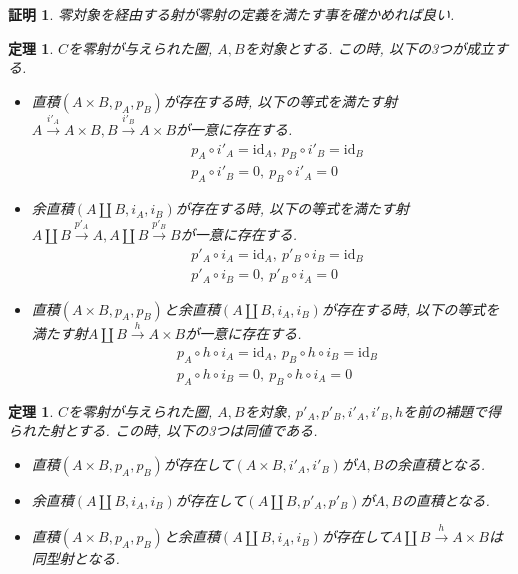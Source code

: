 \documentclass[a4paper,12pt]{ltjsarticle}
\theoremstyle{break}
\newtheorem{thrm}[thm]{定理}
\newtheorem*{prf}{証明}
\newcommand{\xr}[1]{\xrightarrow{#1}}
\newcommand{\id}{\mathrm{id}}
\newcommand{\ci}{\circ}
\newcommand{\ti}{\times}
\newcommand{\am}{\amalg}
\numberwithin{equation}{section}
\begin{document}
\begin{prf}
  零対象を経由する射が零射の定義を満たす事を確かめれば良い. 
\end{prf}


\begin{thrm}
  $C$を零射が与えられた圏, $A,B$を対象とする. 
  この時, 以下の3つが成立する. 
  \begin{itemize}
    \item 直積$(A \ti B,p_A,p_B)$が存在する時, 以下の等式を満たす射$A \xr{i'_A} A \ti B, B \xr{i'_B} A \ti B$が一意に存在する. 
    \begin{align*}
      &p_A \ci i'_A = \id_A, ~ p_B \ci i'_B = \id_B \\
      &p_A \ci i'_B = 0, ~ p_B \ci i'_A = 0
    \end{align*}
    \item 余直積$(A \am B,i_A,i_B)$が存在する時, 以下の等式を満たす射$A \am B \xr{p'_A} A,A \am B \xr{p'_B} B$が一意に存在する. 
    \begin{align*}
      &p'_A \ci i_A = \id_A, ~ p'_B \ci i_B = \id_B \\
      &p'_A \ci i_B = 0, ~ p'_B \ci i_A = 0
    \end{align*}
    \item 直積$(A \ti B,p_A,p_B)$と余直積$(A \am B,i_A,i_B)$が存在する時, 以下の等式を満たす射$A \am B \xr{h} A \ti B$が一意に存在する. 
    \begin{align*}
      &p_A \ci h \ci i_A = \id_A, ~ p_B \ci h \ci i_B = \id_B \\
      &p_A \ci h \ci i_B = 0, ~ p_B \ci h \ci i_A = 0
    \end{align*}
  \end{itemize}
\end{thrm}

\begin{thrm}
  $C$を零射が与えられた圏, $A,B$を対象, $p'_A,p'_B,i'_A,i'_B,h$を前の補題で得られた射とする. 
  この時, 以下の3つは同値である.
  \begin{itemize}
    \item 直積$(A \ti B,p_A,p_B)$が存在して$(A \ti B,i'_A, i'_B)$が$A,B$の余直積となる.
    \item 余直積$(A \am B,i_A,i_B)$が存在して$(A \am B,p'_A, p'_B)$が$A,B$の直積となる.
    \item 直積$(A \ti B,p_A,p_B)$と余直積$(A \am B,i_A,i_B)$が存在して$A \am B \xr{h} A \ti B$は同型射となる. 
  \end{itemize} 
\end{thrm}
\end{document}
